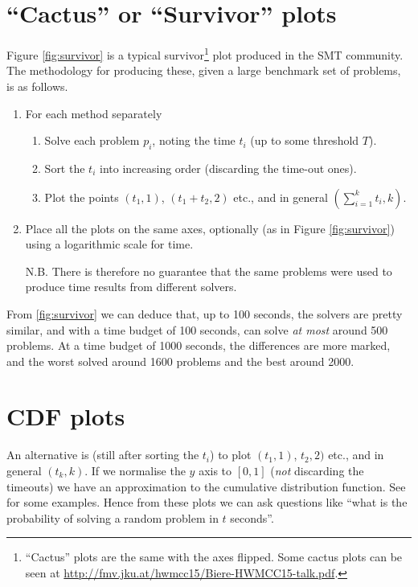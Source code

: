 \section{``Cactus'' or ``Survivor'' plots}
Figure \ref{fig:survivor} is a typical survivor\footnote{``Cactus'' plots are the same with the axes flipped. Some cactus plots can be seen at \url{http://fmv.jku.at/hwmcc15/Biere-HWMCC15-talk.pdf}.} plot produced in the SMT community.
The methodology for producing these, given a large benchmark set of problems, is as follows.
\begin{enumerate}
\item For each method separately
\begin{enumerate}
\item Solve each problem $p_i$, noting the time $t_i$ (up to some threshold $T$).
\item Sort the $t_i$ into increasing order (discarding the time-out ones).
\item Plot the points $(t_1,1)$, $(t_1+t_2,2)$ etc., and in general $(\sum_{i=1}^kt_i,k)$.
\end{enumerate}
\item Place all the plots on the same axes, optionally (as in Figure \ref{fig:survivor}) using a logarithmic scale for time.
\item[N.B.]There is therefore no guarantee that the same problems were used to produce time results from different solvers.
\end{enumerate}
From \ref{fig:survivor} we can deduce that, up to 100 seconds, the solvers are pretty similar, and with a time budget of 100 seconds, can solve \emph{at most} around 500 problems. At a time budget of 1000 seconds, the differences are more marked, and the worst solved around 1600 problems and the best around 2000.
\section{CDF plots}
An alternative is (still after sorting the $t_i$) to plot  $(t_1,1)$, $t_2,2)$ etc., and in general $(t_k,k)$. If we normalise the $y$ axis to $[0,1]$ (\emph{not} discarding the timeouts) we have an approximation to the cumulative distribution function. See \cite{Xuetal2008b} for some examples. Hence from these plots we can ask questions like ``what is the probability of solving a random problem in $t$ seconds''.
